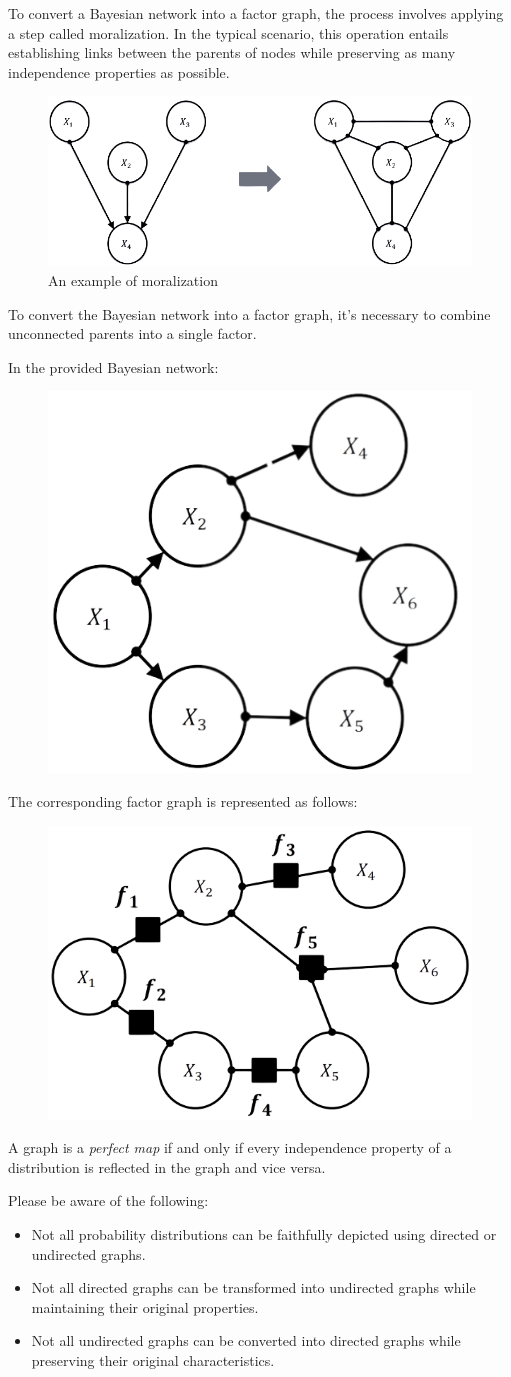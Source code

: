 To convert a Bayesian network into a factor graph, the process involves applying a step called moralization. 
In the typical scenario, this operation entails establishing links between the parents of nodes while preserving as many independence properties as possible.
\begin{figure}[H]
    \centering
    \includegraphics[width=0.5\linewidth]{images/mor.png}
    \caption{An example of moralization}
\end{figure}
To convert the Bayesian network into a factor graph, it's necessary to combine unconnected parents into a single factor.
\begin{example}
    In the provided Bayesian network:
    \begin{figure}[H]
        \centering
        \includegraphics[width=0.25\linewidth]{images/bn.png}
    \end{figure}
    The corresponding factor graph is represented as follows:
    \begin{figure}[H]
        \centering
        \includegraphics[width=0.25\linewidth]{images/bnf.png}
    \end{figure}
\end{example}
\begin{definition}
    A graph is a \emph{perfect map} if and only if every independence property of a distribution is reflected in the graph and vice versa. 
\end{definition}
Please be aware of the following:
\begin{itemize}
    \item Not all probability distributions can be faithfully depicted using directed or undirected graphs.
    \item Not all directed graphs can be transformed into undirected graphs while maintaining their original properties.
    \item Not all undirected graphs can be converted into directed graphs while preserving their original characteristics.
\end{itemize}
